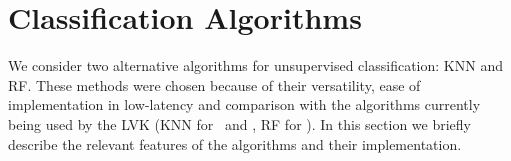 \section{Classification Algorithms} \label{algos}

We consider two alternative algorithms for unsupervised classification: \ac{KNN} and \ac{RF}. These methods were chosen because of their versatility, ease of implementation in low-latency and comparison with the algorithms currently being used by the \ac{LVK} (\ac{KNN} for \hasns\ and \hasrem, \ac{RF} for \hasgap).
In this section we briefly describe the relevant features of the algorithms and their implementation. 




